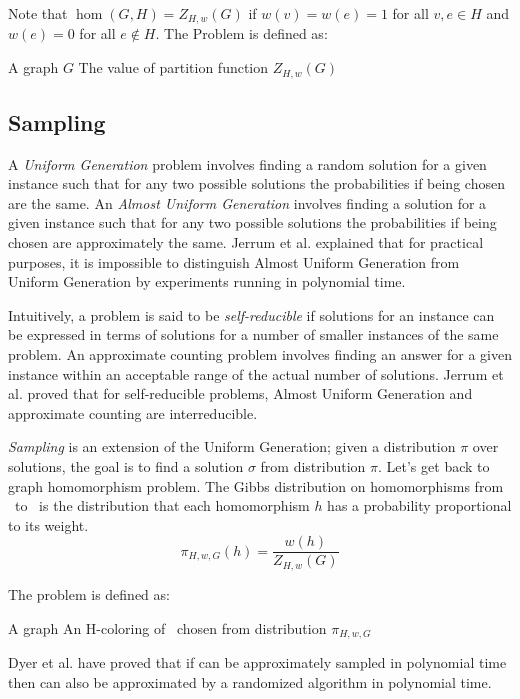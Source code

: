 Note that \(\hom(G,H)=Z_{H,w}(G)\) if \(w(v)=w(e)=1\) for all \(v,e\in H\)
and \(w(e)=0\) for all \(e\not\in H\)\@. 
The  Problem is defined as:

\pnndef%
{A graph \(G\)}
{The value of partition function \(Z_{H,w}(G)\)}

\subsection*{Sampling}
A \emph{Uniform Generation} problem involves finding a
random solution for a given instance such that for any two possible solutions
the probabilities if being chosen are the same.
An \emph{Almost Uniform Generation} involves finding 
a solution for a given instance such that
for any two possible solutions the probabilities if being chosen are approximately the same.
Jerrum et al. \cite{JVV} explained that
for practical purposes, it is impossible to distinguish
Almost Uniform Generation from Uniform Generation by experiments running in polynomial time.

Intuitively, a problem is said to be \emph{self-reducible} if solutions for an instance can be
expressed in terms of solutions for a number of smaller instances of the same problem.
An approximate counting problem involves finding an answer for a given
instance within an acceptable range of the actual number of solutions.
Jerrum et al. \cite{JVV} proved that 
for self-reducible problems, Almost Uniform Generation and approximate counting 
are interreducible. 

\emph{Sampling} is an extension of the Uniform Generation; given a
distribution \(\pi\) over solutions, the goal is to find a solution \(\sigma \)
from distribution \(\pi\)\@.
Let's get back to graph homomorphism problem. 
The Gibbs distribution on homomorphisms from \mG\ to \mH\ is
the distribution that each homomorphism \(h\) has a probability proportional to its weight.
\[\pi_{H,w,G}(h)=\frac{w(h)}{Z_{H,w}(G)}\]

The  problem is defined as:

\pnndef%
{A graph \mG}
{An H-coloring of \mG\ chosen from distribution \(\pi_{H,w,G}\)}

Dyer et al. \cite{Sampling} have proved that if  can be approximately 
sampled in polynomial time then 
can also be approximated by a randomized algorithm in polynomial time. 

